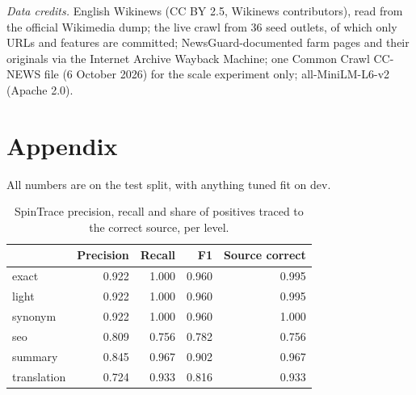 \documentclass[11pt,a4paper]{article}
\newcommand{\hd}[1]{{\headfont\bfseries\footnotesize #1}}
\newcommand{\hrow}{\rowcolor{paper}}
\begin{document}
{\small
\textit{Data credits.} English Wikinews (CC BY 2.5, Wikinews contributors), read from the official Wikimedia dump; the live crawl from 36 seed outlets, of which only URLs and features are committed; NewsGuard-documented farm pages and their originals via the Internet Archive Wayback Machine; one Common Crawl CC-NEWS file (6 October 2026) for the scale experiment only; all-MiniLM-L6-v2 (Apache 2.0).\par}

\clearpage
\appendix
\renewcommand{\thetable}{A\arabic{table}}
\renewcommand{\thefigure}{A\arabic{figure}}
\setcounter{table}{0}
\setcounter{figure}{0}
\section*{Appendix}

All numbers are on the test split, with anything tuned fit on dev.

\begin{table}[H]
  \centering\small
  \caption{SpinTrace precision, recall and share of positives traced to the correct source, per level.}
  \label{tab:pr}
  \begin{tabularx}{0.75\textwidth}{@{}l*{4}{R}@{}}
    \toprule
    \hrow \hd{Level} & \hd{Precision} & \hd{Recall} & \hd{F1} & \hd{Source correct} \\
    \midrule
    exact & 0.922 & 1.000 & 0.960 & 0.995 \\
    light & 0.922 & 1.000 & 0.960 & 0.995 \\
    synonym & 0.922 & 1.000 & 0.960 & 1.000 \\
    seo & 0.809 & 0.756 & 0.782 & 0.756 \\
    summary & 0.845 & 0.967 & 0.902 & 0.967 \\
    translation & 0.724 & 0.933 & 0.816 & 0.933 \\
    \bottomrule
  \end{tabularx}
\end{table}
\end{document}
